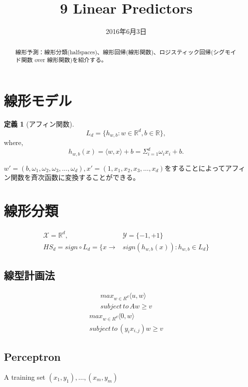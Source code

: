 \documentclass{jarticle}
\title{9 Linear Predictors}
\date{2016年6月3日}
\theoremstyle{definition}
\newtheorem{defi}[thm]{定義}
\begin{document}
\maketitle
\begin{abstract}
線形予測：線形分類(halfspaces)、線形回帰(線形関数)、ロジスティック回帰(シグモイド関数 over 線形関数)を紹介する。
\end{abstract}

\section{線形モデル}
\begin{defi}[アフィン関数]
\begin{equation}
L_d = \{ h_{w,b}:w \in \mathbb{R}^d , b \in \mathbb{R} \}, 
\end{equation}
where, 
\begin{equation}
h_{w,b}(x) = \langle w,x \rangle + b = \Sigma_{i=1}^d \omega_ix_i + b.
\end{equation}
\end{defi}
$w' = (b,\omega_1,\omega_2,\omega_3,\dots,\omega_d) ,x'=(1,x_1,x_2,x_3,\dots,x_d)$をすることによってアフィン関数を斉次函数に変換することができる。
\section{線形分類}
\begin{equation}
\begin{aligned}
\mathcal{X} = \mathbb{R} ^d, &\mathcal{Y} =\{-1,+1\} \\
HS_d = sign \circ L_d = \{x \to &sign(h_{w,b}(x)) :h_{w,b} \in L_d\}
\end{aligned}
\end{equation}
\subsection{線型計画法}
\begin{equation}
\begin{aligned}
max_{w \in R^d} \langle u,w \rangle \\
subject \, to \, Aw \ge v
\end{aligned}
\end{equation}
\begin{equation}
\begin{aligned}
max_{w \in R^d} \langle 0,w \rangle \\
subject \, to \, (y_ix_{i,j})w \ge v
\end{aligned}
\end{equation}

\subsection{Perceptron}
\begin{algorithm}
\begin{algorithmic}[1]
           \Require A training set $(x_1,y_1), \dots , (x_m,y_m)$
\end{algorithmic}
\end{algorithm}
\end{document}
